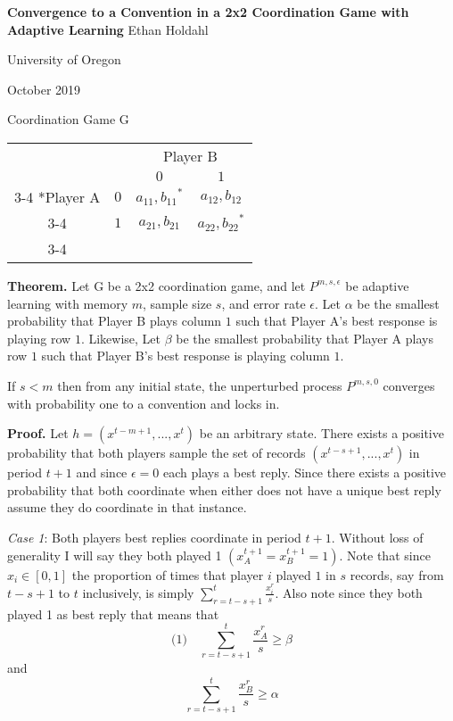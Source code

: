 \documentclass{article}
\begin{document}
\centering
\Large
\textbf{Convergence to a Convention in a 2x2 Coordination Game with Adaptive Learning}
\vskip0pt
Ethan Holdahl

University of Oregon

October 2019

\vskip24pt

\centering
Coordination Game G
\vskip6pt
    \begin{tabular}{cc|c|c|}
      & \multicolumn{1}{c}{} & \multicolumn{2}{c}{Player B}\\
      & \multicolumn{1}{c}{} & \multicolumn{1}{c}{$0$}  & \multicolumn{1}{c}{$1$} \\\cline{3-4}
      \multirow{2}*{Player A}  & $0$ & ${a_{11},b_{11}}^*$ & $a_{12},b_{12}$ \\\cline{3-4}
      & $1$ & $a_{21},b_{21}$ & ${a_{22},b_{22}}^*$ \\\cline{3-4}
    \end{tabular}

\vskip24pt

\raggedright

\textbf{Theorem.} Let G be a 2x2 coordination game, and let $P^{m,s,\epsilon}$ be adaptive learning with memory $m$, sample size $s$, and error rate $\epsilon$. Let $\alpha$ be the smallest probability that Player B plays column $1$ such that Player A's best response is playing row $1$. Likewise, Let $\beta$ be the smallest probability that Player A plays row $1$ such that Player B's best response is playing column $1$.

\vskip12pt
If $s < m$ then from any initial state, the unperturbed process $P^{m,s,0}$ converges with probability one to a convention and locks in.

\vskip12pt

\textbf{Proof.} Let $h = (x^{t-m+1},...,x^{t})$ be an arbitrary state. There exists a positive probability that both players sample the set of records $(x^{t-s+1},...,x^{t})$ in period $t+1$ and since $\epsilon=0$ each plays a best reply. Since there exists a positive probability that both coordinate when either does not have a unique best reply assume they do coordinate in that instance.

\vskip12pt

\textit{Case 1}: Both players best replies coordinate in period $t+1$. Without loss of generality I will say they both played 1 $(x^{t+1}_A=x^{t+1}_B=1)$. Note that since $x_i \in [0,1]$ the proportion of times that player $i$ played $1$ in $s$ records, say from $t-s+1$ to $t$ inclusively, is simply $\sum\limits_{r=t-s+1}^{t} \frac{x_i^r}{s}$. Also note since they both played 1 as best reply that means that 
$$\text{(1)} \hspace{12pt} \sum\limits_{r=t-s+1}^t \frac{x^r_A}{s} \geq \beta$$
and 
$$\sum\limits_{r=t-s+1}^t \frac{x^r_B}{s} \geq \alpha$$
\end{document}
